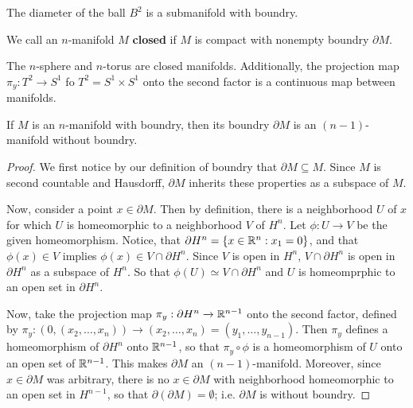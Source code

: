 \begin{example}\label{example.1.4}
    The diameter of the ball $B^2$ is a submanifold with boundry.
\end{example}

\begin{definition}
    We call an $n$-manifold $M$ \textbf{closed} if $M$ is compact with nonempty
    boundry $\partial{M}$.
\end{definition}

\begin{example}\label{example_1.5}
    The $n$-sphere and  $n$-torus are closed manifolds. Additionally, the
    projection map  $\pi_y:T^2 \xrightarrow{} S^1$ fo $T^2=S^1 \times S^1$ onto
    the second factor is a continuous map between manifolds.
\end{example}

\begin{lemma}\label{1.1.4}
    If $M$ is an  $n$-manifold with boundry, then its boundry  $\partial{M}$ is
    an $(n-1)$-manifold without boundry.
\end{lemma}
\begin{proof}
    We first notice by our definition of boundry that $\partial{M} \subseteq M$.
    Since $M$ is second countable and Hausdorff,  $\partial{M}$ inherits these
    properties as a subspace of $M$.

    Now, consider a point $x \in \partial{M}$. Then by definition, there is a
    neighborhood $U$ of  $x$ for which  $U$ is homeomorphic to a neighborhood
    $V$ of $H^n$. Let $\phi:U \xrightarrow{} V$ be the given homeomorphism.
    Notice, that $\partial{H^n} = \{x \in \mathbb{R}^n : x_1=0\}$, and that $\phi(x) \in
    V$ implies $\phi(x) \in V \cap \partial{H^n}$. Since $V$ is open in $H^n$,
    $V \cap \partial{H^n}$ is open in $\partial{H^n}$ as a subspace of $H^n$.
    So that $\phi(U) \simeq V \cap \partial{H^n}$ and $U$ is homeomprphic to an
    open set in  $\partial{H^n}$.

    Now, take the projection map $\pi_y:\partial{H^n} \xrightarrow{} \mathbb{R}^{n-1}$
    onto the second factor, defined by $\pi_y:(0,(x_2, \dots, x_n))
    \xrightarrow{} (x_2, \dots, x_n)=(y_1, \dots, y_{n-1})$. Then $\pi_y$
    defines a homeomorphism of  $\partial{H^n}$ onto $\mathbb{R}^{n-1}$, so that $\pi_y
    \circ \phi$ is a homeomorphism of  $U$ onto an open set of  $\mathbb{R}^{n-1}$. This
    makes $\partial{M}$ an $(n-1)$-manifold. Moreover, since $x \in \partial{M}$
    was arbitrary, there is no $x \in \partial{M}$ with neighborhood
    homeomorphic to an open set in $H^{n-1}$, so that
    $\partial{(\partial{M})}=\emptyset$; i.e. $\partial{M}$ is without boundry.
\end{proof}
